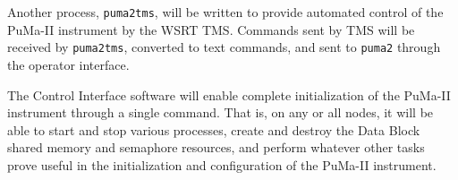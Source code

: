 Another process, {\tt puma2tms}, will be written to provide automated
control of the PuMa-II instrument by the WSRT TMS.  Commands sent by
TMS will be received by {\tt puma2tms}, converted to text commands,
and sent to {\tt puma2} through the operator interface.

The Control Interface software will enable complete initialization of
the PuMa-II instrument through a single command.  That is, on any or
all nodes, it will be able to start and stop various processes, create
and destroy the Data Block shared memory and semaphore resources, and
perform whatever other tasks prove useful in the initialization and
configuration of the PuMa-II instrument.

